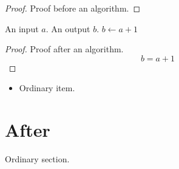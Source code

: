 \documentclass{article}
\begin{document}
\begin{proof}Proof before an algorithm.\end{proof}
\begin{algorithm}
\begin{algorithmic}[1]
\REQUIRE An input $a$.
\ENSURE An output $b$.
\STATE $b\gets a+1$
\end{algorithmic}
\end{algorithm}
\begin{proof}
Proof after an algorithm.
\[b=a+1\]
\end{proof}
\begin{itemize}\item Ordinary item.\end{itemize}
\section{After}Ordinary section.
\end{document}
